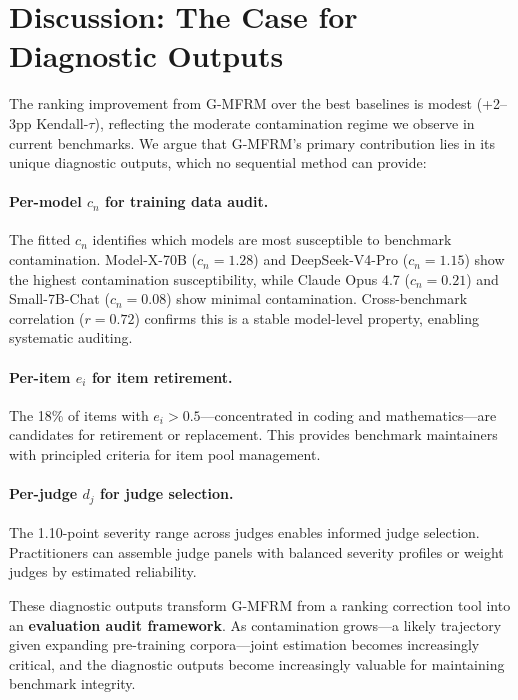 \documentclass[11pt]{article}
\newcommand{\gmfrm}{G-MFRM}
\newcommand{\cn}{c_n}
\newcommand{\ei}{e_i}
\newcommand{\severity}{d_j}
\begin{document}
\section{Discussion: The Case for Diagnostic Outputs}

The ranking improvement from \gmfrm{} over the best baselines is modest (+2--3pp Kendall-$\tau$), reflecting the moderate contamination regime we observe in current benchmarks.
We argue that \gmfrm{}'s primary contribution lies in its unique diagnostic outputs, which no sequential method can provide:

\paragraph{Per-model $\cn$ for training data audit.}
The fitted $\cn$ identifies which models are most susceptible to benchmark contamination.
Model-X-70B ($\cn = 1.28$) and DeepSeek-V4-Pro ($\cn = 1.15$) show the highest contamination susceptibility, while Claude Opus 4.7 ($\cn = 0.21$) and Small-7B-Chat ($\cn = 0.08$) show minimal contamination.
Cross-benchmark correlation ($r = 0.72$) confirms this is a stable model-level property, enabling systematic auditing.

\paragraph{Per-item $\ei$ for item retirement.}
The 18\% of items with $\ei > 0.5$---concentrated in coding and mathematics---are candidates for retirement or replacement.
This provides benchmark maintainers with principled criteria for item pool management.

\paragraph{Per-judge $\severity$ for judge selection.}
The 1.10-point severity range across judges enables informed judge selection.
Practitioners can assemble judge panels with balanced severity profiles or weight judges by estimated reliability.

These diagnostic outputs transform \gmfrm{} from a ranking correction tool into an \textbf{evaluation audit framework}.
As contamination grows---a likely trajectory given expanding pre-training corpora---joint estimation becomes increasingly critical, and the diagnostic outputs become increasingly valuable for maintaining benchmark integrity.
\end{document}
